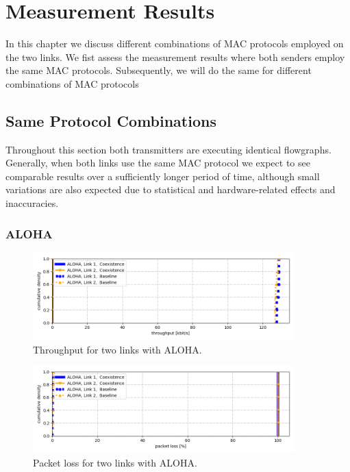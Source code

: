 \chapter{Measurement Results}
\label{ch:results}

In this chapter we discuss different combinations of MAC protocols employed on the two links.  We fist assess the measurement results where both senders employ the same MAC protocols. Subsequently, we will do the same for different combinations of MAC protocols 

\section{Same Protocol Combinations}
\label{sec:same-protocols}

Throughout this section both transmitters are executing identical flowgraphs. Generally, when both links use the same MAC protocol we expect to see comparable results over a sufficiently longer period of time, although small variations are also expected due to statistical and hardware-related effects and inaccuracies. 

\subsection{ALOHA}
\label{sec:dbl-aloha}

\begin{figure}[tb]
	\label{fig:results-aloha-dbl-throughput}
	\begin{center}
		\includegraphics[width=0.9\textwidth]{pictures/results/same_combinations/aloha/throughput_cdf}
	\end{center}
	\caption{Throughput for two links with ALOHA.}
\end{figure}

\begin{figure}[tb]
	\label{fig:results-aloha-dbl-packet-loss}
	\begin{center}
		\includegraphics[width=0.9\textwidth]{pictures/results/same_combinations/aloha/packet_loss_cdf}
	\end{center}
	\caption{Packet loss for two links with ALOHA.}
\end{figure}

